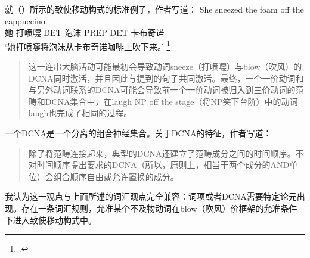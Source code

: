 \begin{exe}
\begin{xlist}[iv.]
\begin{exe}
\begin{xlist}[iv.]
就（）所示的致使移动构式的标准例子，作者写道：
\ea
\gll She sneezed the foam off the cappuccino.\\
     她 打喷嚏 DET 泡沫 PREP DET 卡布奇诺\\
\glt `她打喷嚏将泡沫从卡布奇诺咖啡上吹下来。'
\footnote{
.
}
\z
\begin{quote}
  这一连串大脑活动可能最初会导致动词sneeze（打喷嚏）与blow（吹风）的DCNA同时激活，并且因此与提到的句子共同激活。最终，一个一价动词和与另外动词联系的DCNA可能会导致前一个一价动词被归入到三价动词的范畴和DCNA集合中，在laugh NP off the stage（将NP笑下台阶）中的动词laugh也完成了相同的过程。\citep*{PCShandbookCxG}
\end{quote}
一个DCNA是一个分离的组合神经集合。关于DCNA的特征，作者写道：
\begin{quote}
除了将范畴连接起来，典型的DCNA还建立了范畴成分之间的时间顺序。不对时间顺序提出要求的DCNA（所以，原则上，相当于两个成分的AND单位）会组合顺序自由或允许置换的成分。\citep*[]{PCShandbookCxG}
\end{quote}
我认为这一观点与上面所述的词汇观点完全兼容：词项或者DCNA需要特定论元出现。存在一条词汇规则，允准某个不及物动词在blow（吹风）价框架的允准条件下进入致使移动构式中。


\end{xlist}
\end{exe}
\end{xlist}
\end{exe}
